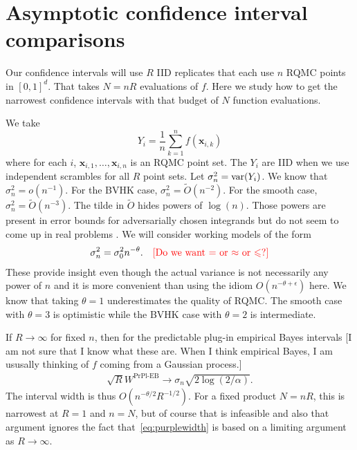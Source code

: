 \documentclass{article}
\newcommand{\art}[1]{\begingroup\color{blue}#1\endgroup}
\newcommand{\fred}[1]{\begingroup\color{red}#1\endgroup}
\renewcommand{\le}{\leqslant}
\newcommand{\e}{\mathbb{E}}
\newcommand{\bsx}{\boldsymbol{x}}
\newcommand{\giv}{\!\mid\!} %
\newcommand{\prpleb}{\text{PrPl-EB}}
\begin{document}

\section{Asymptotic confidence interval comparisons}\label{sec:asymptotic}

Our confidence intervals will use $R$ IID replicates that each
use $n$ RQMC points in $[0,1]^d$.  That takes $N=nR$
evaluations of $f$. 
Here we study how to get the narrowest confidence
intervals with that budget of $N$ function evaluations.

We take 
$$Y_i=\frac1n\sum_{k=1}^nf(\bsx_{i,k})$$
where for each $i$, $\bsx_{i,1},\dots,\bsx_{i,n}$ is an RQMC
point set. The $Y_i$ are IID when we use independent
scrambles for all $R$ point sets. Let $\sigma^2_n = \operatorname{var}(Y_i)$.
We know that $\sigma^2_n = o(n^{-1}).$
For the BVHK case, $\sigma^2_n=\tilde O(n^{-2})$.  
For the smooth case,
$\sigma^2_n=\tilde O(n^{-3})$.  
The tilde in $\tilde O$ hides powers of $\log(n)$.
Those powers are present in error bounds for adversarially
chosen integrands but do not seem to come up in
real problems \cite{schl:2002,wherearethelogs}.
We will consider working
models of the form
\begin{align}\label{eq:themodel}
\sigma^2_n = \sigma^2_0n^{-\theta}.  \fred{\quad \text{[Do we want $=$ or $\approx$ or $\le$?]}}
\end{align}
These provide insight even though the actual variance is not
necessarily any power of $n$ and it is more convenient
than using the idiom $O(n^{-\theta+\epsilon})$ here.
We know that taking $\theta=1$ underestimates
the quality of RQMC. The smooth case with $\theta = 3$ is optimistic
while the BVHK case with $\theta=2$ is intermediate.

If $R\to\infty$ for fixed $n$, then for the predictable
plug-in empirical Bayes intervals \fred{[I am not sure that I know what these are.  When I think empirical Bayes, I am ususally thinking of $f$ coming from a Gaussian process.]}
\begin{align}\label{eq:purplewidth}
\sqrt{R}W^\prpleb\to \sigma_n\sqrt{2\log(2/\alpha)}.
\end{align}
The interval width is thus $O(n^{-\theta/2}R^{-1/2})$.
For a fixed product $N=nR$, this is narrowest at $R=1$
and $n=N$, but of course that is infeasible and also
that argument ignores the fact that~\eqref{eq:purplewidth}
is based on a limiting argument as $R\to\infty$.
\end{document}
